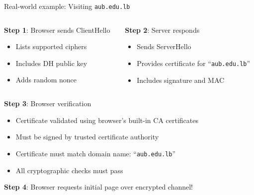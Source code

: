 \documentclass[aspectratio=169, lualatex, handout]{beamer}
\begin{document}
\begin{frame}{Real-world example: Visiting \texttt{aub.edu.lb}}
	\begin{columns}[c]
		\begin{column}{0.5\textwidth}
			\textbf{Step 1}: Browser sends ClientHello
			\begin{itemize}[<+->]
				\item Lists supported ciphers
				\item Includes DH public key
				\item Adds random nonce
			\end{itemize}
		\end{column}
		\begin{column}{0.5\textwidth}
			\textbf{Step 2}: Server responds
			\begin{itemize}[<+->]
				\item Sends ServerHello
				\item Provides certificate for ``\texttt{aub.edu.lb}''
				\item Includes signature and MAC
			\end{itemize}
		\end{column}
	\end{columns}
	\pause
	\begin{center}
		\textbf{Step 3}: Browser verification
	\end{center}
	\begin{itemize}[<+->]
		\item Certificate validated using browser's built-in CA certificates
		\item Must be signed by trusted certificate authority
		\item Certificate must match domain name: ``\texttt{aub.edu.lb}''
		\item All cryptographic checks must pass
	\end{itemize}
	\pause
	\begin{center}
		\textbf{Step 4}: Browser requests initial page over encrypted channel!
	\end{center}
\end{frame}
\end{document}
